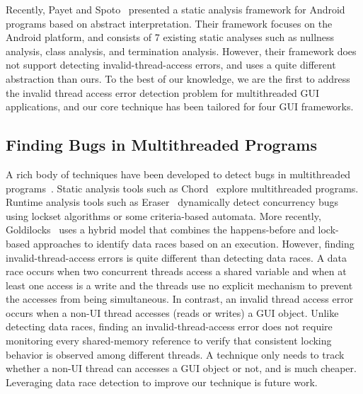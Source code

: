 Recently, Payet and Spoto~\cite{Payet:2011:SAA:2032266.2032299} presented a static
analysis framework for Android programs based on  abstract
interpretation. Their framework focuses on the Android platform, and
 consists of 7 existing static analyses such as
nullness analysis, class analysis, and termination analysis.  However,
their framework does not support detecting invalid-thread-access
errors, and uses a quite different abstraction than ours.
To the best of our knowledge, we are the first to address the invalid
thread access error detection problem for multithreaded GUI applications, and
our core technique has been tailored for four GUI frameworks.


\tinystep
\subsection{Finding Bugs in Multithreaded Programs}


A rich body of techniques have been developed to detect bugs in multithreaded programs~\cite{Huang:2011:PPC:2001420.2001438, Weeratunge:2010, Huang:2011:EST}.
Static analysis tools such as Chord~\cite{Naik:2006}
explore multithreaded programs. Runtime
analysis tools such as Eraser~\cite{Savage:1997}  dynamically detect concurrency bugs using lockset
algorithms or some criteria-based automata. 
More recently, Goldilocks~\cite{Elmas:2007} uses a
hybrid model that combines the happens-before and lock-based
approaches to identify data races based on an execution.
However, finding invalid-thread-access errors is quite different than detecting data races.
A data race occurs when two concurrent threads access
a shared variable and when at least one access is a write and the threads
use no explicit mechanism to prevent the accesses from being simultaneous. In contrast,
an invalid thread access error occurs when a non-UI thread accesses (reads or writes) a GUI object.
Unlike detecting data races, finding an invalid-thread-access error does not require monitoring every shared-memory
reference to verify that consistent locking behavior is observed among different threads.
A technique only needs to track whether a non-UI thread can accesses a GUI object or not,
and is much cheaper. Leveraging data race detection to 
improve our technique is future work.


